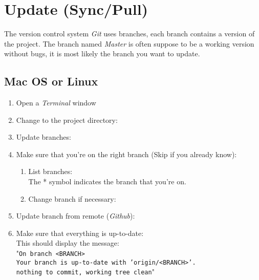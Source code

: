 \section{Update (Sync/Pull)} \label{oppdatere}

The version control system \textit{Git} uses branches, each branch contains a version of the project. The branch named \textit{Master} is often suppose to be a working version without bugs, it is most likely the branch you want to update. 
\subsection{Mac OS or Linux}
\begin{enumerate}
    \item Open a \textit{Terminal} window
    \item Change to the project directory:
    \item Update branches:
    \item  Make sure that you're on the right branch (Skip if you already know):
    \begin{enumerate}
        \item List branches:
         \\
        The * symbol indicates the branch that you're on.  
        \item Change branch if necessary:
    \end{enumerate}
    \item Update branch from remote (\textit{Github}):
    \item Make sure that everything is up-to-date:
    \\
    This should display the message: \\
    "\texttt{On branch <BRANCH>\\
    Your branch is up-to-date with 'origin/<BRANCH>'.\\
    nothing to commit, working tree clean}"
    
\end{enumerate}

